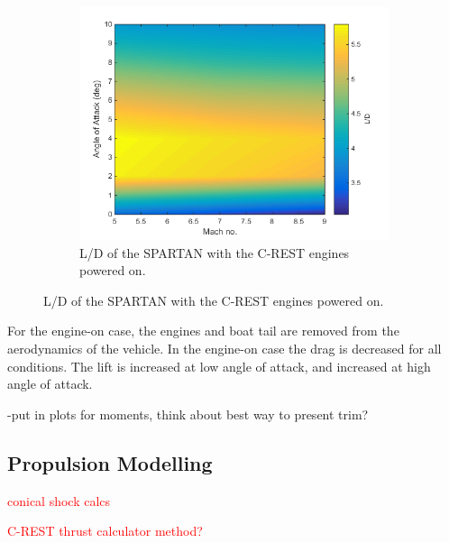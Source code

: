 \begin{figure}
\begin{subfigure}{.5\textwidth}
	\label{fig:Cd-EngineOn}
\end{subfigure}
\begin{subfigure}{.5\textwidth}
	\centering
	\includegraphics[width=0.99\linewidth]{figures/3_vehicle_design/LD-EngineOn}
	\caption{L/D of the SPARTAN with the C-REST engines powered on.}
	\label{fig:LD-EngineOn}
\end{subfigure}
\end{figure}

For the engine-on case, the engines and boat tail are removed from the aerodynamics of the vehicle. In the engine-on case the drag is decreased for all conditions. The lift is increased at low angle of attack, and increased at high angle of attack.


-put in plots for moments, think about best way to present trim?

		
		\subsection{Propulsion Modelling}
		
		\textcolor{red}{conical shock calcs}
		
		\textcolor{red}{C-REST thrust calculator method?}
		
